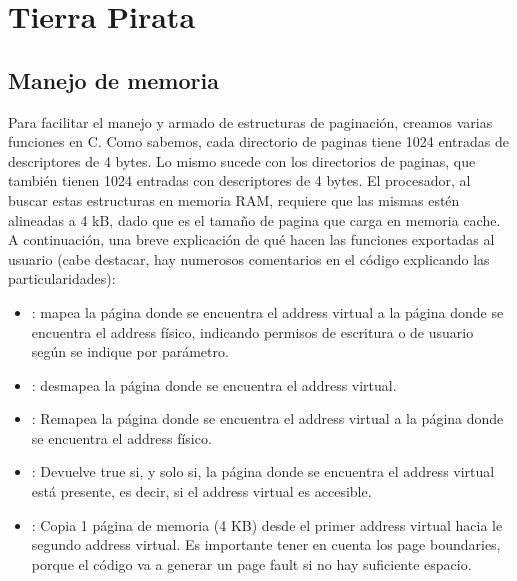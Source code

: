 \section{Tierra Pirata}

\subsection{Manejo de memoria}

Para facilitar el manejo y armado de estructuras de paginación, creamos varias funciones en C. Como sabemos, cada directorio de paginas tiene 1024 entradas de descriptores de 4 bytes. Lo mismo sucede con los directorios de paginas, que también tienen 1024 entradas con descriptores de 4 bytes. El procesador, al buscar estas estructuras en memoria RAM, requiere que las mismas estén alineadas a 4 kB, dado que es el tamaño de pagina que carga en memoria cache. A continuación, una breve explicación de qué hacen las funciones exportadas al usuario (cabe destacar, hay numerosos comentarios en el código explicando las particularidades):

\begin{itemize}
\item {}: mapea la página donde se encuentra el address virtual a la página donde se encuentra el address físico, indicando permisos de escritura o de usuario según se indique por parámetro.

\item {}: desmapea la página donde se encuentra el address virtual.

\item {}: Remapea la página donde se encuentra el address virtual a la página donde se encuentra el address físico.

\item {}: Devuelve true si, y solo si, la página donde se encuentra el address virtual está presente, es decir, si el address virtual es accesible.

\item {}: Copia 1 página de memoria (4 KB) desde el primer address virtual hacia le segundo address virtual. Es importante tener en cuenta los page boundaries, porque el código va a generar un page fault si no hay suficiente espacio.
\end{itemize}

